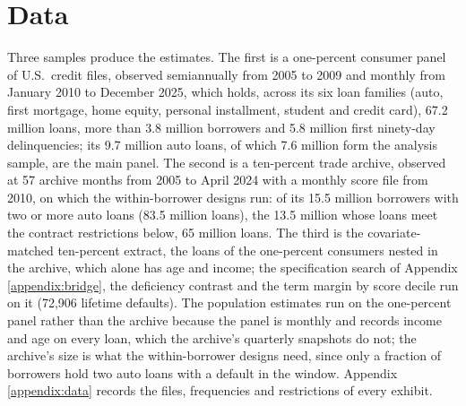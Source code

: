 \section{Data}\label{sec:data}

Three samples produce the estimates. The first is a one-percent consumer panel of U.S.\ credit files, observed semiannually from 2005 to 2009 and monthly from January 2010 to December 2025, which holds, across its six loan families (auto, first mortgage, home equity, personal installment, student and credit card), 67.2 million loans, more than 3.8 million borrowers and 5.8 million first ninety-day delinquencies; its 9.7 million auto loans, of which 7.6 million form the analysis sample, are the main panel. The second is a ten-percent trade archive, observed at 57 archive months from 2005 to April 2024 with a monthly score file from 2010, on which the within-borrower designs run: of its 15.5 million borrowers with two or more auto loans (83.5 million loans), the 13.5 million whose loans meet the contract restrictions below, 65 million loans. The third is the covariate-matched ten-percent extract, the loans of the one-percent consumers nested in the archive, which alone has age and income; the specification search of Appendix \ref{appendix:bridge}, the deficiency contrast and the term margin by score decile run on it (72,906 lifetime defaults). The population estimates run on the one-percent panel rather than the archive because the panel is monthly and records income and age on every loan, which the archive's quarterly snapshots do not; the archive's size is what the within-borrower designs need, since only a fraction of borrowers hold two auto loans with a default in the window. Appendix \ref{appendix:data} records the files, frequencies and restrictions of every exhibit.
